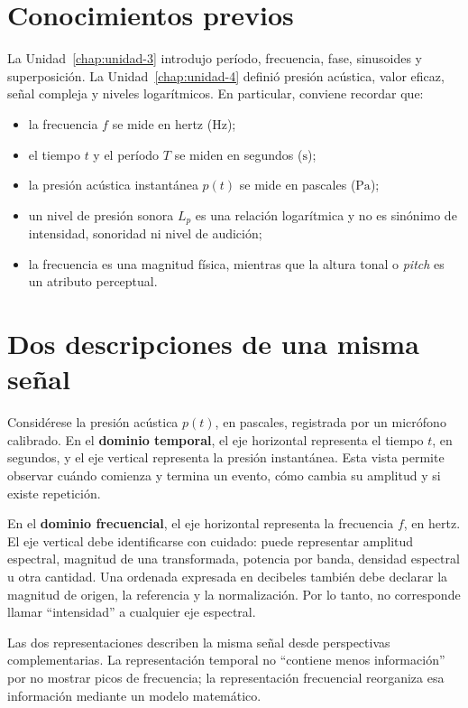 \section{Conocimientos previos}
\label{sec:u5-conocimientos-previos}

La Unidad~\ref{chap:unidad-3} introdujo período, frecuencia, fase,
sinusoides y superposición. La Unidad~\ref{chap:unidad-4} definió presión
acústica, valor eficaz, señal compleja y niveles logarítmicos. En particular,
conviene recordar que:

\begin{itemize}
    \item la frecuencia \(f\) se mide en hertz (\(\text{Hz}\));
    \item el tiempo \(t\) y el período \(T\) se miden en segundos
    (\(\text{s}\));
    \item la presión acústica instantánea \(p(t)\) se mide en pascales
    (\(\text{Pa}\));
    \item un nivel de presión sonora \(L_p\) es una relación logarítmica y no
    es sinónimo de intensidad, sonoridad ni nivel de audición;
    \item la frecuencia es una magnitud física, mientras que la altura tonal o
    \emph{pitch} es un atributo perceptual.
\end{itemize}

\section{Dos descripciones de una misma señal}
\label{sec:u5-tiempo-frecuencia}

Considérese la presión acústica \(p(t)\), en pascales, registrada por un
micrófono calibrado. En el \textbf{dominio temporal}, el eje horizontal
representa el tiempo \(t\), en segundos, y el eje vertical representa la
presión instantánea. Esta vista permite observar cuándo comienza y termina un
evento, cómo cambia su amplitud y si existe repetición.

En el \textbf{dominio frecuencial}, el eje horizontal representa la frecuencia
\(f\), en hertz. El eje vertical debe identificarse con cuidado: puede
representar amplitud espectral, magnitud de una transformada, potencia por
banda, densidad espectral u otra cantidad. Una ordenada expresada en decibeles
también debe declarar la magnitud de origen, la referencia y la normalización.
Por lo tanto, no corresponde llamar ``intensidad'' a cualquier eje espectral.

Las dos representaciones describen la misma señal desde perspectivas
complementarias. La representación temporal no ``contiene menos información''
por no mostrar picos de frecuencia; la representación frecuencial reorganiza
esa información mediante un modelo matemático.

